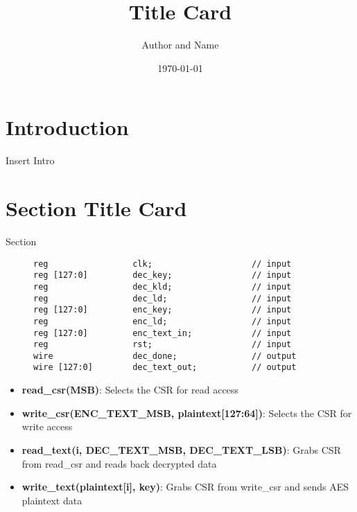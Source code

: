 \documentclass[12pt, letterpaper]{article}%
\title{Title Card}%
\author{Author and Name}%
\date{\today}%
\begin{document}
\normalsize
\maketitle
\tableofcontents
\thispagestyle{empty} %
\newpage
\section{Introduction}
\label{intro}
Insert Intro

\section{Section Title Card}
Section 

\begin{tcolorbox}
\end{tcolorbox}

\begin{figure}[h]
    \centering
    \begin{varwidth}{\linewidth}
    \begin{verbatim}
reg                 clk;                    // input
reg [127:0]         dec_key;                // input
reg                 dec_kld;                // input
reg                 dec_ld;                 // input
reg [127:0]         enc_key;                // input
reg                 enc_ld;                 // input
reg [127:0]         enc_text_in;            // input
reg                 rst;                    // input
wire                dec_done;               // output
wire [127:0]        dec_text_out;           // output
    \end{verbatim}
    \end{varwidth}
\end{figure}


\begin{itemize}
    \item \textbf{read\_csr(MSB)}: Selects the CSR for read access
    \item \textbf{write\_csr(ENC\_TEXT\_MSB, plaintext[127:64])}: Selects the CSR for write access
    \item \textbf{read\_text(i, DEC\_TEXT\_MSB, DEC\_TEXT\_LSB)}: Grabs CSR
        from read\_csr and reads back decrypted data
    \item \textbf{write\_text(plaintext[i], key)}: Grabs CSR from write\_csr 
        and sends AES plaintext data
\end{itemize}
\end{document}
